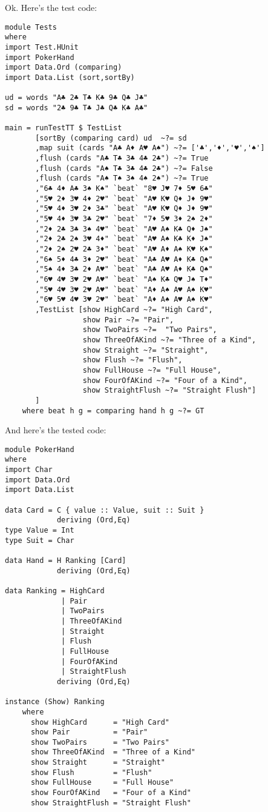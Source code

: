 \lhN Ok. Here's the test code:
\begin{lstlisting}[frame=single]
module Tests
where 
import Test.HUnit
import PokerHand
import Data.Ord (comparing)
import Data.List (sort,sortBy)

ud = words "A♣ 2♣ T♣ K♣ 9♣ Q♣ J♣"
sd = words "2♣ 9♣ T♣ J♣ Q♣ K♣ A♣"

main = runTestTT $ TestList 
       [sortBy (comparing card) ud  ~?= sd
       ,map suit (cards "A♣ A♦ A♥ A♠") ~?= ['♣','♦','♥','♠']
       ,flush (cards "A♣ T♣ 3♣ 4♣ 2♣") ~?= True
       ,flush (cards "A♠ T♣ 3♣ 4♣ 2♣") ~?= False
       ,flush (cards "A♠ T♠ 3♠ 4♠ 2♠") ~?= True
       ,"6♣ 4♦ A♣ 3♠ K♠" `beat` "8♥ J♥ 7♦ 5♥ 6♣"
       ,"5♥ 2♦ 3♥ 4♦ 2♥" `beat` "A♥ K♥ Q♦ J♦ 9♥"
       ,"5♥ 4♦ 3♥ 2♦ 3♣" `beat` "A♥ K♥ Q♦ J♦ 9♥"
       ,"5♥ 4♦ 3♥ 3♣ 2♥" `beat` "7♦ 5♥ 3♦ 2♠ 2♦"
       ,"2♦ 2♣ 3♣ 3♠ 4♥" `beat` "A♥ A♠ K♣ Q♦ J♠"  
       ,"2♦ 2♣ 2♠ 3♥ 4♦" `beat` "A♥ A♠ K♣ K♦ J♠"
       ,"2♦ 2♠ 2♥ 2♣ 3♦" `beat` "A♥ A♦ A♠ K♥ K♠"
       ,"6♠ 5♦ 4♣ 3♦ 2♥" `beat` "A♣ A♥ A♦ K♣ Q♠"
       ,"5♠ 4♦ 3♣ 2♦ A♥" `beat` "A♣ A♥ A♦ K♣ Q♠"
       ,"6♥ 4♥ 3♥ 2♥ A♥" `beat` "A♠ K♣ Q♥ J♠ T♦"
       ,"5♥ 4♥ 3♥ 2♥ A♥" `beat` "A♦ A♠ A♥ A♠ K♥"
       ,"6♥ 5♥ 4♥ 3♥ 2♥" `beat` "A♦ A♠ A♥ A♠ K♥"
       ,TestList [show HighCard ~?= "High Card",
                  show Pair ~?= "Pair",
                  show TwoPairs ~?=  "Two Pairs",
                  show ThreeOfAKind ~?= "Three of a Kind",
                  show Straight ~?= "Straight",
                  show Flush ~?= "Flush",
                  show FullHouse ~?= "Full House",
                  show FourOfAKind ~?= "Four of a Kind",
                  show StraightFlush ~?= "Straight Flush"] 
       ]
    where beat h g = comparing hand h g ~?= GT
\end{lstlisting} %
\lhA And here's the tested code:
\begin{lstlisting}[frame=single]
module PokerHand
where
import Char
import Data.Ord
import Data.List

data Card = C { value :: Value, suit :: Suit } 
            deriving (Ord,Eq)
type Value = Int
type Suit = Char

data Hand = H Ranking [Card]
            deriving (Ord,Eq)

data Ranking = HighCard
             | Pair
             | TwoPairs
             | ThreeOfAKind
             | Straight
             | Flush
             | FullHouse
             | FourOfAKind
             | StraightFlush
            deriving (Ord,Eq)

instance (Show) Ranking
    where
      show HighCard      = "High Card"
      show Pair          = "Pair" 
      show TwoPairs      = "Two Pairs" 
      show ThreeOfAKind  = "Three of a Kind" 
      show Straight      = "Straight" 
      show Flush         = "Flush" 
      show FullHouse     = "Full House" 
      show FourOfAKind   = "Four of a Kind"
      show StraightFlush = "Straight Flush"
\end{lstlisting}
